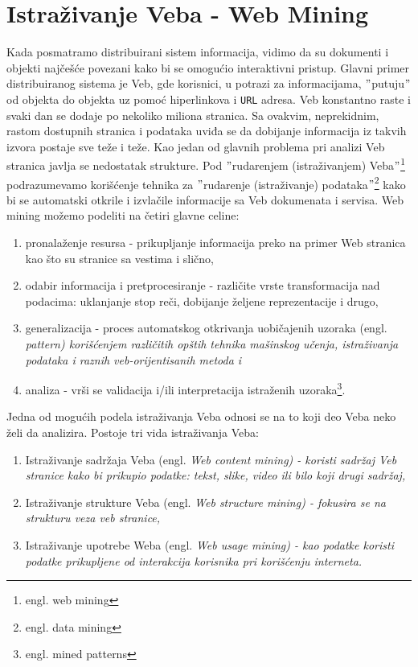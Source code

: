 \documentclass[a4paper]{article}
\begin{document}
\section{Istraživanje Veba - Web Mining}
\label{sec:veb}
Kada posmatramo distribuirani sistem informacija, vidimo da su dokumenti i objekti najčešće povezani kako bi se omogućio interaktivni pristup. Glavni primer distribuiranog sistema je Veb, gde korisnici, u potrazi za informacijama, $"$putuju$"$ od objekta do objekta uz pomoć hiperlinkova i \texttt{URL} adresa. Veb konstantno raste i svaki dan se dodaje po nekoliko miliona stranica. Sa ovakvim, neprekidnim, rastom dostupnih stranica i podataka uviđa se da dobijanje informacija iz takvih izvora postaje sve teže i teže. Kao jedan od glavnih problema pri analizi Veb stranica javlja se nedostatak strukture. Pod $"$rudarenjem (istraživanjem) Veba$"$\footnote{engl. web mining} podrazumevamo korišćenje tehnika za $"$rudarenje (istraživanje) podataka$"$\footnote{engl. data mining} kako bi se automatski otkrile i izvlačile informacije sa Veb dokumenata i servisa. Web mining možemo podeliti na četiri glavne celine:
\begin{enumerate}
\item pronalaženje resursa - prikupljanje informacija preko na primer Web stranica kao što su stranice sa vestima i slično,
\item odabir informacija i pretprocesiranje - različite vrste transformacija nad podacima: uklanjanje stop reči, dobijanje željene reprezentacije i drugo,
\item generalizacija - proces automatskog otkrivanja uobičajenih uzoraka (engl. \em{pattern}) korišćenjem različitih opštih tehnika mašinskog učenja, istraživanja podataka i raznih veb-orijentisanih metoda i  
\item analiza - vrši se validacija i/ili interpretacija istraženih uzoraka\footnote{engl.  mined patterns}. 
\end{enumerate}
Jedna od mogućih podela istraživanja Veba odnosi se na to koji deo Veba neko želi da analizira. Postoje tri vida istraživanja Veba:
\begin{enumerate}
\item Istraživanje sadržaja Veba (engl. \em{Web content mining}) - koristi sadržaj Veb stranice kako bi prikupio podatke: tekst, slike, video ili bilo koji drugi sadržaj,
\item Istraživanje strukture Veba (engl. \em{Web structure mining}) - fokusira se na strukturu veza veb stranice,
\item Istraživanje upotrebe Weba (engl. \em{Web usage mining}) - kao podatke koristi podatke prikupljene od interakcija korisnika pri korišćenju interneta.
\end{enumerate}
\end{document}
